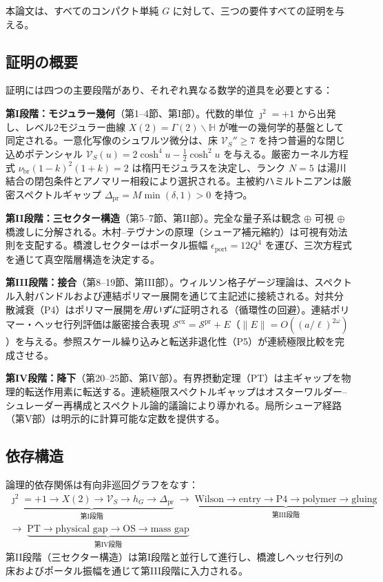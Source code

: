\documentclass[12pt]{article}
\theoremstyle{plain}
\theoremstyle{definition}
\numberwithin{equation}{section}
\newcommand{\HH}{\mathbb{H}}
\newcommand{\pr}{\mathrm{pr}}
\newcommand{\br}{\mathrm{br}}
\newcommand{\ex}{\mathrm{ex}}
\begin{document}
本論文は、すべてのコンパクト単純 $G$ に対して、三つの要件すべての証明を与える。

\subsection*{証明の概要}

証明には四つの主要段階があり、それぞれ異なる数学的道具を必要とする：

\textbf{第I段階：モジュラー幾何}（第1--4節、第I部）。代数的単位 $\jmath^2=+1$ から出発し、レベル2モジュラー曲線 $X(2)=\Gamma(2)\backslash\HH$ が唯一の幾何学的基盤として同定される。一意化写像のシュワルツ微分は、床 $\mathcal{V}_S''\geq 7$ を持つ普遍的な閉じ込めポテンシャル $\mathcal{V}_S(u)=2\cosh^4 u-\frac{1}{2}\cosh^2 u$ を与える。厳密カーネル方程式 $\nu_{\br}(1-k)^2(1+k)=2$ は楕円モジュラスを決定し、ランク $N=5$ は湯川結合の閉包条件とアノマリー相殺により選択される。主被約ハミルトニアンは厳密スペクトルギャップ $\Delta_{\pr}=M\min(\delta,1)>0$ を持つ。

\textbf{第II段階：三セクター構造}（第5--7節、第II部）。完全な量子系は観念 $\oplus$ 可視 $\oplus$ 橋渡しに分解される。木村--テヴナンの原理（シューア補元縮約）は可視有効法則を支配する。橋渡しセクターはポータル振幅 $\epsilon_{\mathrm{port}}=12Q^4$ を運び、三次方程式を通じて真空階層構造を決定する。

\textbf{第III段階：接合}（第8--19節、第III部）。ウィルソン格子ゲージ理論は、スペクトル入射バンドルおよび連結ポリマー展開を通じて主記述に接続される。対共分散減衰（P4）はポリマー展開を\emph{用いずに}証明される（循環性の回避）。連結ポリマー・ヘッセ行列評価は厳密接合表現 $\mathcal{S}^{\ex}=\mathcal{S}^{\pr}+E$（$\|E\|=O((a/\ell)^{2\omega})$）を与える。参照スケール繰り込みと転送非退化性（P5）が連続極限比較を完成させる。

\textbf{第IV段階：降下}（第20--25節、第IV部）。有界摂動定理（PT）は主ギャップを物理的転送作用素に転送する。連続極限スペクトルギャップはオスターワルダー--シュレーダー再構成とスペクトル論的議論により導かれる。局所シューア経路（第V部）は明示的に計算可能な定数を提供する。

\subsection*{依存構造}

論理的依存関係は有向非巡回グラフをなす：
\begin{gather*}
\underbrace{\jmath^2=+1\to X(2)\to\mathcal{V}_S\to h_G\to\Delta_{\pr}}_{\text{第I段階}}
\;\to\;
\underbrace{\text{Wilson}\to\text{entry}\to\text{P4}\to\text{polymer}\to\text{gluing}}_{\text{第III段階}}\\[4pt]
\to\;
\underbrace{\text{PT}\to\text{physical gap}\to\text{OS}\to\text{mass gap}}_{\text{第IV段階}}
\end{gather*}
第II段階（三セクター構造）は第I段階と並行して進行し、橋渡しヘッセ行列の床およびポータル振幅を通じて第III段階に入力される。
\end{document}
